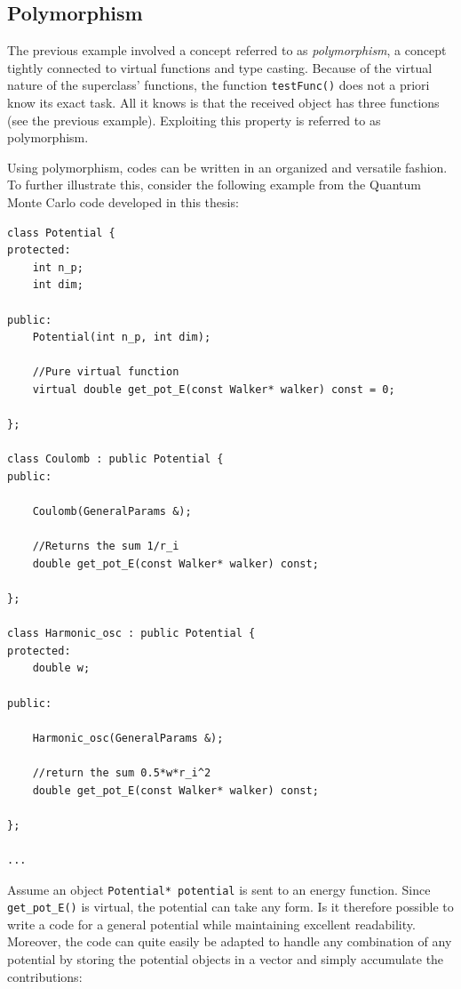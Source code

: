 \subsection{Polymorphism}
\label{sec:typeCastPoly}

The previous example involved a concept referred to as \textit{polymorphism}, a concept tightly connected to virtual functions and type casting. Because of the virtual nature of the superclass' functions, the function \verb+testFunc()+ does not a priori know its exact task. All it knows is that the received object has three functions (see the previous example). Exploiting this property is referred to as polymorphism.

Using polymorphism, codes can be written in an organized and versatile fashion. To further illustrate this, consider the following example from the Quantum Monte Carlo code developed in this thesis:

\clearpage
\vspace{0.5 cm}
\begin{lstlisting}
class Potential {
protected:
    int n_p;
    int dim;

public:
    Potential(int n_p, int dim);

    //Pure virtual function
    virtual double get_pot_E(const Walker* walker) const = 0;

};

class Coulomb : public Potential {
public:

    Coulomb(GeneralParams &);

    //Returns the sum 1/r_i
    double get_pot_E(const Walker* walker) const;

};

class Harmonic_osc : public Potential {
protected:
    double w;

public:

    Harmonic_osc(GeneralParams &);

    //return the sum 0.5*w*r_i^2
    double get_pot_E(const Walker* walker) const;

};

...

\end{lstlisting}

Assume an object \verb+Potential* potential+ is sent to an energy function. Since \verb+get_pot_E()+ is virtual, the potential can take any form. Is it therefore possible to write a code for a general potential while maintaining excellent readability. Moreover, the code can quite easily be adapted to handle any combination of any potential by storing the potential objects in a vector and simply accumulate the contributions:

